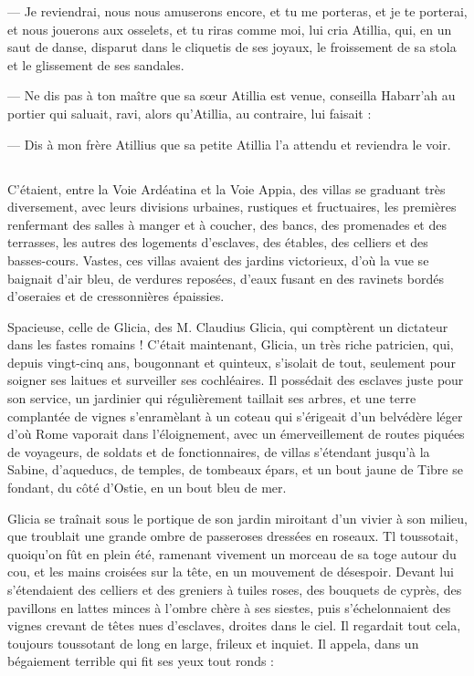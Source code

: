 \documentclass[a4paper, 11pt, oneside, polutonikogreek, french]{article}
\begin{document}
--- Je reviendrai, nous nous amuserons encore, et tu me porteras, et je te porterai, et nous jouerons aux osselets, et tu riras comme moi, lui cria Atillia, qui, en un saut de danse, disparut dans le cliquetis de ses joyaux, le froissement de sa stola et le glissement de ses sandales.

--- Ne dis pas à ton maître que sa sœur Atillia est venue, conseilla Habarr'ah au portier qui saluait, ravi, alors qu’Atillia, au contraire, lui faisait :

--- Dis à mon frère Atillius que sa petite Atillia l'a attendu et reviendra le voir.
\clearpage
\subsection{}
\paragraph{}
C'étaient, entre la Voie Ardéatina et la Voie Appia, des villas se graduant très diversement, avec leurs divisions urbaines, rustiques et fructuaires, les premières renfermant des salles à manger et à coucher, des bancs, des promenades et des terrasses, les autres des logements d'esclaves, des étables, des celliers et des basses-cours. Vastes, ces villas avaient des jardins victorieux, d'où la vue se baignait d'air bleu, de verdures reposées, d'eaux fusant en des ravinets bordés d'oseraies et de cressonnières épaissies.

Spacieuse, celle de Glicia, des M. Claudius Glicia, qui comptèrent un dictateur dans les fastes romains ! C'était maintenant, Glicia, un très riche patricien, qui, depuis vingt-cinq ans, bougonnant et quinteux, s'isolait de tout, seulement pour soigner ses laitues et surveiller ses cochléaires. Il possédait des esclaves juste pour son service, un jardinier qui régulièrement taillait ses arbres, et une terre complantée de vignes s'enramèlant à un coteau qui s'érigeait d'un belvédère léger d'où Rome vaporait dans l'éloignement, avec un émerveillement de routes piquées de voyageurs, de soldats et de fonctionnaires, de villas s'étendant jusqu'à la Sabine, d'aqueducs, de temples, de tombeaux épars, et un bout jaune de Tibre se fondant, du côté d'Ostie, en un bout bleu de mer.

Glicia se traînait sous le portique de son jardin miroitant d'un vivier à son milieu, que troublait une grande ombre de passeroses dressées en roseaux. Tl toussotait, quoiqu'on fût en plein été, ramenant vivement un morceau de sa toge autour du cou, et les mains croisées sur la tête, en un mouvement de désespoir. Devant lui s'étendaient des celliers et des greniers à tuiles roses, des bouquets de cyprès, des pavillons en lattes minces à l'ombre chère à ses siestes, puis s'échelonnaient des vignes crevant de têtes nues d'esclaves, droites dans le ciel. Il regardait tout cela, toujours toussotant de long en large, frileux et inquiet. Il appela, dans un bégaiement terrible qui fit ses yeux tout ronds :
\end{document}
